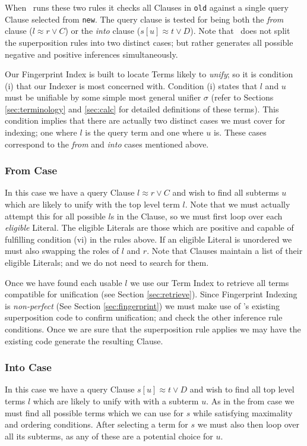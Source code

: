 When \beagle\ runs these two rules it checks all Clauses in \verb!old! against
a single query Clause selected from \verb!new!. The query clause is tested
for being both the \emph{from} clause ($l \approx r \lor C$) or the \emph{into}
clause ($s[u] \approx t \lor D$). Note that \beagle\ does not split the superposition rules into
two distinct cases; but rather generates all possible negative and positive inferences simultaneously.

Our Fingerprint Index is built to locate Terms likely to \emph{unify}; so
it is condition (i) that our Indexer is most concerned with. Condition (i) states that
$l$ and $u$ must be unifiable by some simple most general unifier $\sigma$ (refer
to Sections \ref{sec:terminology} and \ref{sec:calc} for detailed definitions of
these terms). This condition implies that there are actually two distinct
cases we must cover for indexing; one where $l$ is the query term and one where $u$ is.
These cases correspond to the \emph{from} and \emph{into} cases mentioned
above.

\subsubsection{From Case}
In this case we have a query Clause $l \approx r \lor C$ and wish to find all
subterms $u$ which are likely to unify with the top level term $l$. Note that we must actually
attempt this for all possible $l$s in the Clause, so we must first loop over
each \emph{eligible} Literal. The eligible Literals are those which are positive and capable
of fulfilling condition (vi) in the rules above. If an eligible Literal is unordered we
must also swapping the roles of $l$ and $r$. Note that Clauses maintain a list of their
eligible Literals; and we do not need to search for them.

Once we have found each usable $l$ we use our Term Index to retrieve all terms compatible for unification
(see Section \ref{sec:retrieve}). Since Fingerprint Indexing is \emph{non-perfect} (See Section \ref{sec:fingerprint})
we must make use of \beagle's existing superposition code
to confirm unification; and check the other inference rule conditions. Once we
are sure that the superposition rule applies we may have the existing code
generate the resulting Clause.

\subsubsection{Into Case}
In this case we have a query Clause $s[u] \approx t \lor D$ and wish to find all
top level terms $l$ which are likely to unify with with a subterm $u$. As in the
from case we must find all possible terms which we can use for $s$ while satisfying
maximality and ordering conditions. After selecting a term for $s$ we must 
also then loop over all its subterms, as any of these are a potential choice
for $u$.

